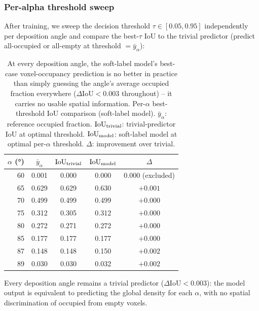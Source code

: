 \documentclass[aip,amsmath,amssymb,reprint]{revtex4-1}
\renewcommand{\ang}{\ensuremath{\alpha}} %
\newcommand{\iou}{\ensuremath{\mathrm{IoU}}}
\begin{document}
\subsubsection{Per-alpha threshold sweep}

After training, we sweep the decision threshold $\tau \in [0.05, 0.95]$
independently per deposition angle and compare the best-$\tau$ IoU
to the trivial predictor (predict all-occupied or all-empty at
threshold $= \bar{y}_\alpha$):

\begin{table}[htbp]
  \centering
  \caption{%
    At every deposition angle, the soft-label model's best-case
    voxel-occupancy prediction is no better in practice than
    simply guessing the angle's average occupied fraction
    everywhere ($\Delta\iou < 0.003$ throughout) -- it carries no
    usable spatial information.
    Per-$\alpha$ best-threshold IoU comparison (soft-label model).
    $\bar{y}_\alpha$: reference occupied fraction.
    $\iou_{\rm trivial}$: trivial-predictor IoU at optimal threshold.
    $\iou_{\rm model}$: soft-label model at optimal per-$\alpha$ threshold.
    $\Delta$: improvement over trivial.
  }
  \label{tab:soft_iou}
  \begin{tabular}{rcccc}
    \toprule
    $\ang$ (°) & $\bar{y}_\alpha$ & $\iou_{\rm trivial}$ & $\iou_{\rm model}$ & $\Delta$ \\
    \midrule
    60 & 0.001 & 0.000 & 0.000 & 0.000 (excluded) \\
    65 & 0.629 & 0.629 & 0.630 & $+0.001$ \\
    70 & 0.499 & 0.499 & 0.499 & $+0.000$ \\
    75 & 0.312 & 0.305 & 0.312 & $+0.000$ \\
    80 & 0.272 & 0.271 & 0.272 & $+0.000$ \\
    85 & 0.177 & 0.177 & 0.177 & $+0.000$ \\
    87 & 0.148 & 0.148 & 0.150 & $+0.002$ \\
    89 & 0.030 & 0.030 & 0.032 & $+0.002$ \\
    \bottomrule
  \end{tabular}
\end{table}

Every deposition angle remains a trivial predictor ($\Delta\iou < 0.003$):
the model output is equivalent to predicting the global density
for each $\ang$, with no spatial discrimination of occupied from
empty voxels.

\end{document}
